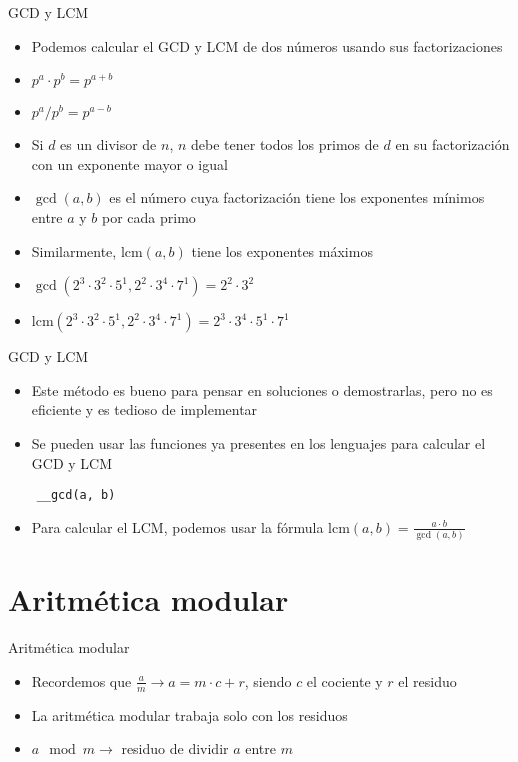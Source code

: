 \documentclass[10pt]{beamer}
\newcommand{\bi}{\begin{itemize}}
\newcommand{\ei}{\end{itemize}}
\begin{document}
\begin{frame}{GCD y LCM}
  \bi
    \item Podemos calcular el GCD y LCM de dos números usando sus factorizaciones

    \item $p^a \cdot p^b = p^{a+b}$
    \item $p^a / p^b = p^{a - b}$

    \item<2-> Si $d$ es un divisor de $n$, $n$ debe tener todos los primos de $d$ en su factorización con un exponente mayor o igual
    \item<3-> $\gcd(a, b)$ es el número cuya factorización tiene los exponentes mínimos entre $a$ y $b$ por cada primo
    \item<3-> Similarmente, $\text{lcm}(a, b)$ tiene los exponentes máximos
    \vspace{10pt}
    \item<4-> $\gcd(2^3 \cdot 3^2 \cdot 5^1, 2^2 \cdot 3^4 \cdot 7^1) = 2^2 \cdot 3^2$
    \item<5-> $\text{lcm}(2^3 \cdot 3^2 \cdot 5^1, 2^2 \cdot 3^4 \cdot 7^1) = 2^3 \cdot 3^4 \cdot 5^1 \cdot 7^1$
  \ei
\end{frame}

\begin{frame}[fragile]{GCD y LCM}
  \bi
    \item Este método es bueno para pensar en soluciones o demostrarlas, pero no es eficiente y es tedioso de implementar
    \item Se pueden usar las funciones ya presentes en los lenguajes para calcular el GCD y LCM
  \ei
  \begin{verbatim}
    __gcd(a, b)
  \end{verbatim}
  \bi
    \item Para calcular el LCM, podemos usar la fórmula $\text{lcm}(a, b) = \frac{a \cdot b}{\gcd(a, b)}$
  \ei
\end{frame}


\section{Aritmética modular}

\begin{frame}{Aritmética modular}
  \bi
    \item Recordemos que $\frac{a}{m} \rightarrow a = m \cdot c + r$, siendo $c$ el cociente y $r$ el residuo
    \item La aritmética modular trabaja solo con los residuos
    \item $a \mod m \rightarrow$ residuo de dividir $a$ entre $m$
  \ei
\end{frame}
\end{document}
